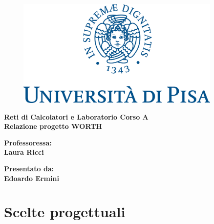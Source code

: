 \documentclass[11pt]{report}
\begin{document}
	
	\begin{titlepage}
		
		\linespread{2}
		
		\begin{figure}[t]
			\centering\includegraphics[width=0.9\textwidth]{unipi_logo}
		\end{figure}
		
		\begin{center}
			\vspace*{5mm}
			{\LARGE{\bf Reti di Calcolatori e Laboratorio Corso A}}\\
			\vspace{5mm}
			{\LARGE{\bf Relazione progetto WORTH}}\\
		\end{center}
		
		\vspace{10mm}
		
		
		\vspace{30mm}
		
		\hfill
		\begin{minipage}[t]{0.47\textwidth}\raggedright
			{\large{\bf Professoressa: \\ Laura Ricci\\ }}
		\end{minipage}
		\hfill
		\begin{minipage}[t]{0.47\textwidth}\raggedleft
			{\large{\bf Presentato da: \\ Edoardo Ermini\\ }}
		\end{minipage}
		
	\end{titlepage}

	\tableofcontents
	
	\chapter{Scelte progettuali}
	
\end{document}
